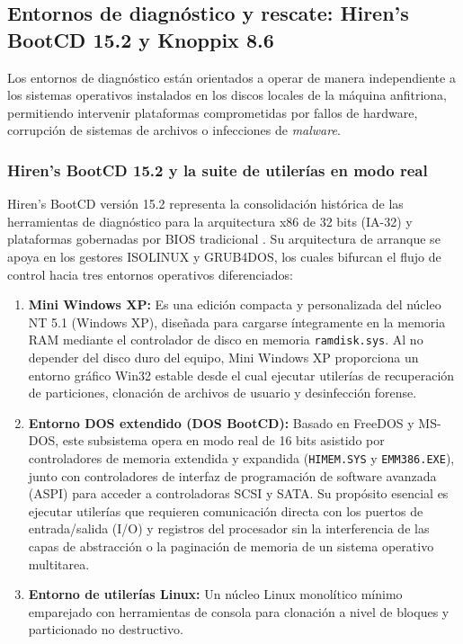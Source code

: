 \documentclass[12pt]{article}
\begin{document}
\subsection{Entornos de diagnóstico y rescate: Hiren's BootCD 15.2 y Knoppix 8.6}
\label{sec:entornosDiagnostico}

Los entornos de diagnóstico están orientados a operar de manera independiente a los sistemas operativos instalados en los discos locales de la máquina anfitriona, permitiendo intervenir plataformas comprometidas por fallos de hardware, corrupción de sistemas de archivos o infecciones de \textit{malware}.

\subsubsection{Hiren's BootCD 15.2 y la suite de utilerías en modo real}

Hiren's BootCD versión 15.2 representa la consolidación histórica de las herramientas de diagnóstico para la arquitectura x86 de 32 bits (IA-32) y plataformas gobernadas por BIOS tradicional \parencite{hiren2012bootcd}. Su arquitectura de arranque se apoya en los gestores ISOLINUX y GRUB4DOS, los cuales bifurcan el flujo de control hacia tres entornos operativos diferenciados:
\begin{enumerate}[noitemsep, topsep=2pt]
    \item \textbf{Mini Windows XP:} Es una edición compacta y personalizada del núcleo NT 5.1 (Windows XP), diseñada para cargarse íntegramente en la memoria RAM mediante el controlador de disco en memoria \texttt{ramdisk.sys}. Al no depender del disco duro del equipo, Mini Windows XP proporciona un entorno gráfico Win32 estable desde el cual ejecutar utilerías de recuperación de particiones, clonación de archivos de usuario y desinfección forense.
    \item \textbf{Entorno DOS extendido (DOS BootCD):} Basado en FreeDOS y MS-DOS, este subsistema opera en modo real de 16 bits asistido por controladores de memoria extendida y expandida (\texttt{HIMEM.SYS} y \texttt{EMM386.EXE}), junto con controladores de interfaz de programación de software avanzada (ASPI) para acceder a controladoras SCSI y SATA. Su propósito esencial es ejecutar utilerías que requieren comunicación directa con los puertos de entrada/salida (I/O) y registros del procesador sin la interferencia de las capas de abstracción o la paginación de memoria de un sistema operativo multitarea.
    \item \textbf{Entorno de utilerías Linux:} Un núcleo Linux monolítico mínimo emparejado con herramientas de consola para clonación a nivel de bloques y particionado no destructivo.
\end{enumerate}
\end{document}
